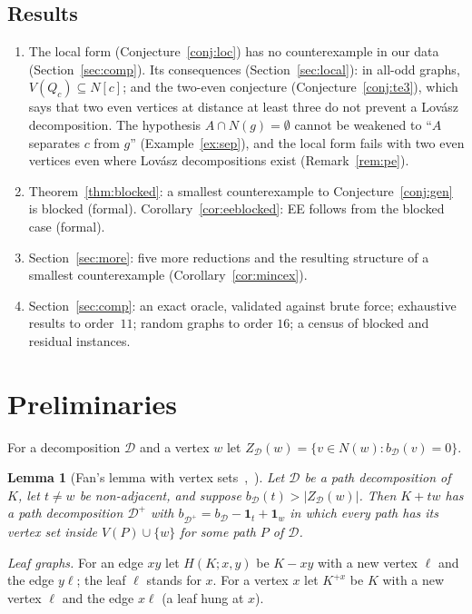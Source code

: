 \documentclass[11pt]{amsart}
\newtheorem{lemma}[theorem]{Lemma}
\theoremstyle{definition}
\newcommand{\cD}{\mathcal D}
\begin{document}
\subsection*{Results}
\begin{enumerate}
\item The local form (Conjecture~\ref{conj:loc}) has no counterexample in our data
(Section~\ref{sec:comp}). Its consequences (Section~\ref{sec:local}): in all-odd graphs,
$V(Q_c)\subseteq N[c]$; and the two-even conjecture (Conjecture~\ref{conj:te3}), which says that two even
vertices at distance at least three do not prevent a Lov\'asz decomposition. The hypothesis
$A\cap N(g)=\emptyset$ cannot be weakened to ``$A$ separates $c$ from $g$'' (Example~\ref{ex:sep}),
and the local form fails with two even vertices even where Lov\'asz decompositions exist
(Remark~\ref{rem:pe}).
\item Theorem~\ref{thm:blocked}: a smallest counterexample to Conjecture~\ref{conj:gen} is blocked
(formal). Corollary~\ref{cor:eeblocked}: EE follows from the blocked case (formal).
\item Section~\ref{sec:more}: five more reductions and the resulting structure of a smallest
counterexample (Corollary~\ref{cor:mincex}).
\item Section~\ref{sec:comp}: an exact oracle, validated against brute force; exhaustive results to
order~$11$; random graphs to order $16$; a census of blocked and residual instances.
\end{enumerate}

\section{Preliminaries}\label{sec:prelim}

For a decomposition $\cD$ and a vertex $w$ let $Z_\cD(w)=\{v\in N(w):b_\cD(v)=0\}$.

\begin{lemma}[{Fan's lemma with vertex sets~\cite{Fan05},~\cite[Lemma~2.2]{RD}}]\label{lem:fan}
Let $\cD$ be a path decomposition of $K$, let $t\ne w$ be non-adjacent, and suppose
$b_\cD(t)>|Z_\cD(w)|$. Then $K+tw$ has a path decomposition $\cD^+$ with
$b_{\cD^+}=b_\cD-\mathbf 1_t+\mathbf 1_w$ in which every path has its vertex set inside $V(P)\cup\{w\}$
for some path $P$ of $\cD$.
\end{lemma}

\emph{Leaf graphs.} For an edge $xy$ let $H(K;x,y)$ be $K-xy$ with a new vertex $\ell$ and the edge
$y\ell$; the leaf $\ell$ stands for $x$. For a vertex $x$ let $K^{+x}$ be $K$ with a new vertex
$\ell$ and the edge $x\ell$ (a leaf hung at $x$).
\end{document}

